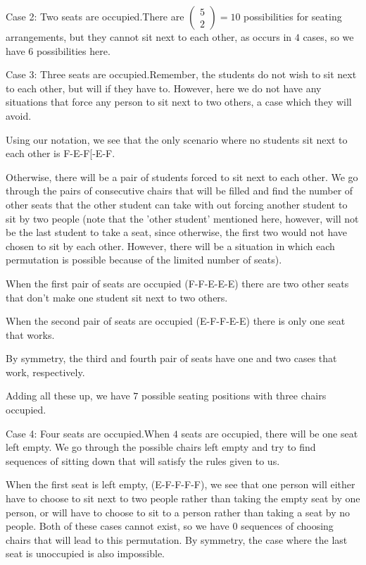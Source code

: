 \begin{enumerate}
 
Case 2: Two seats are occupied.There are $\begin{pmatrix} 5\\2\end{pmatrix} = 10$ possibilities for seating arrangements, but they cannot sit next to each other, as occurs in $4$ cases, so we have $\boxed{6}$ possibilities here.

 
Case 3: Three seats are occupied.Remember, the students do not wish to sit next to each other, but will if they have to.  However, here we do not have any situations that force any person to sit next to two others, a case which they will avoid.

 Using our notation, we see that the only scenario where no students sit next to each other is F-E-F[-E-F.

 Otherwise, there will be a pair of students forced to sit next to each other.  We go through the pairs of consecutive chairs that will be filled and find the number of other seats that the other student can take with out forcing another student to sit by two people (note that the 'other student' mentioned here, however, will not be the last student to take a seat, since otherwise, the first two would not have chosen to sit by each other.  However, there will be a situation in which each permutation is possible because of the limited number of seats).

 When the first pair of seats are occupied (F-F-E-E-E) there are two other seats that don't make one student sit next to two others.

 When the second pair of seats are occupied (E-F-F-E-E) there is only one seat that works.

 By symmetry, the third and fourth pair of seats have one and two cases that work, respectively.  

 Adding all these up, we have $\boxed{7}$ possible seating positions with three chairs occupied.

 
Case 4: Four seats are occupied.When $4$ seats are occupied, there will be one seat left empty.  We go through the possible chairs left empty and try to find sequences of sitting down that will satisfy the rules given to us.

 When the first seat is left empty, (E-F-F-F-F), we see that one person will either have to choose to sit next to two people rather than taking the empty seat by one person, or will have to choose to sit to a person rather than taking a seat by no people.  Both of these cases cannot exist, so we have $0$ sequences of choosing chairs that will lead to this permutation.  By symmetry, the case where the last seat is unoccupied is also impossible.


\end{enumerate}
